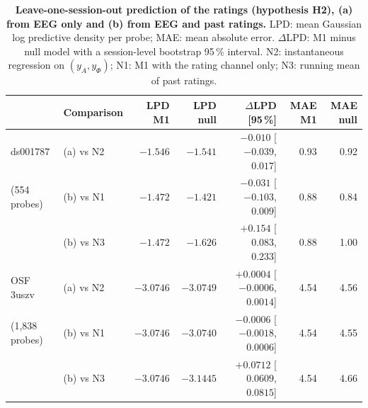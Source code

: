 \begin{table}[t]
\caption{\textbf{Leave-one-session-out prediction of the ratings (hypothesis H2), (a) from EEG only and (b) from EEG and past ratings.} LPD: mean Gaussian log predictive density per probe; MAE: mean absolute error. \mbox{$\Delta$}LPD: M1 minus null model with a session-level bootstrap 95\,\% interval. N2: instantaneous regression on $(y_A,y_\Phi)$; N1: M1 with the rating channel only; N3: running mean of past ratings.}
\label{tab:loso}
\centering\footnotesize
\setlength{\tabcolsep}{5pt}
\begin{tabular}{llrrrrr}
\toprule
 & Comparison & LPD M1 & LPD null & $\Delta$LPD [95\,\%] & MAE M1 & MAE null \\
\midrule
ds001787 & (a) vs N2 & $-1.546$ & $-1.541$ & $-0.010$ [$-0.039$, $0.017$] & 0.93 & 0.92 \\
(554 probes) & (b) vs N1 & $-1.472$ & $-1.421$ & $-0.031$ [$-0.103$, $0.009$] & 0.88 & 0.84 \\
 & (b) vs N3 & $-1.472$ & $-1.626$ & $+0.154$ [$0.083$, $0.233$] & 0.88 & 1.00 \\
\midrule
OSF 3uszv & (a) vs N2 & $-3.0746$ & $-3.0749$ & $+0.0004$ [$-0.0006$, $0.0014$] & 4.54 & 4.56 \\
(1,838 probes) & (b) vs N1 & $-3.0746$ & $-3.0740$ & $-0.0006$ [$-0.0018$, $0.0006$] & 4.54 & 4.55 \\
 & (b) vs N3 & $-3.0746$ & $-3.1445$ & $+0.0712$ [$0.0609$, $0.0815$] & 4.54 & 4.66 \\
\bottomrule
\end{tabular}
\end{table}

